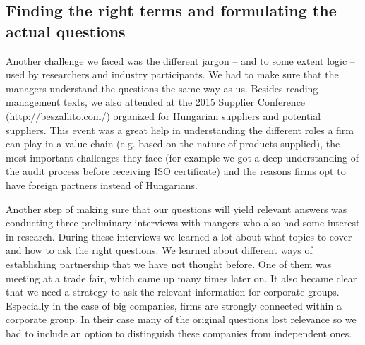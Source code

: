 \documentclass[final, dvipsnames, authoryear,12pt]{elsarticle}
\begin{document}
\subsection{Finding the right terms and formulating the actual questions}
\label{sec:terms}

Another challenge we faced was the different jargon -- and to some extent logic -- used by researchers and industry participants. We had to make sure that the managers understand the questions the same way as us. Besides reading management texts, we also attended at the 2015 Supplier Conference (http://beszallito.com/) organized for Hungarian suppliers and potential suppliers. This event was a great help in understanding the different roles a firm can play in a value chain (e.g. based on the nature of products supplied), the most important challenges they face (for example we got a deep understanding of the audit process before receiving ISO certificate) and the reasons firms opt to have foreign partners instead of Hungarians.

Another step of making sure that our questions will yield relevant answers was conducting three preliminary interviews with mangers who also had some interest in research. During these interviews we learned a lot about what topics to cover and how to ask the right questions. We learned about different ways of establishing partnership that we have not thought before. One of them was meeting at a trade fair, which came up many times later on. It also became clear that we need a strategy to ask the relevant information for corporate groups. Especially in the case of big companies, firms are strongly connected within a corporate group. In their case many of the original questions lost relevance so we had to include an option to distinguish these companies from independent ones.


\end{document}
